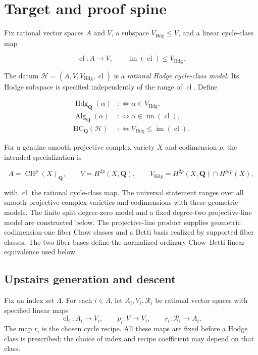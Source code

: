 \documentclass[11pt]{article}
\theoremstyle{definition}
\theoremstyle{remark}
\DeclareMathOperator{\CH}{CH}
\newcommand{\Q}{\mathbf Q}
\begin{document}
\begingroup
\small
\tableofcontents
\endgroup

\section{Target and proof spine}
\label{sec:target}

Fix rational vector spaces \(A\) and \(V\), a subspace
\(V_{\mathrm{Hdg}}\leq V\), and a linear cycle-class map

\[
  \operatorname{cl}:A\longrightarrow V,
  \qquad
  \operatorname{im}(\operatorname{cl})\leq V_{\mathrm{Hdg}}.
\]

The datum
\(\mathscr H=(A,V,V_{\mathrm{Hdg}},\operatorname{cl})\) is a
\emph{rational Hodge cycle-class model}.  Its Hodge subspace is specified independently
of the range of \(\operatorname{cl}\).  Define

\begin{align*}
  \operatorname{Hdg}_{\Q}(\alpha)&:\Longleftrightarrow
    \alpha\in V_{\mathrm{Hdg}},\\
  \operatorname{Alg}_{\Q}(\alpha)&:\Longleftrightarrow
    \alpha\in\operatorname{im}(\operatorname{cl}),\\
  \mathrm{HC}_{\Q}(\mathscr H)&:\Longleftrightarrow
    V_{\mathrm{Hdg}}\leq\operatorname{im}(\operatorname{cl}).
\end{align*}

For a genuine smooth projective complex variety \(X\) and codimension \(p\),
the intended specialization is

\[
  A=\CH^p(X)_{\Q},\qquad
  V=H^{2p}(X,\Q),\qquad
  V_{\mathrm{Hdg}}=H^{2p}(X,\Q)\cap H^{p,p}(X),
\]

with \(\operatorname{cl}\) the rational cycle-class map. The universal
statement ranges over all smooth projective complex varieties and
codimensions with these geometric models. The finite split degree-zero
model and a fixed degree-two projective-line model are constructed below.
The projective-line product supplies geometric codimension-one fiber Chow
classes and a Betti basis realized by supported fiber classes. The two fiber
bases define the normalized ordinary Chow--Betti linear equivalence used
below.

\subsection{Upstairs generation and descent}
\label{subsec:upstairs-generation}

Fix an index set \(\Lambda\). For each \(i\in\Lambda\), let
\(A_i,V_i,\mathcal R_i\) be rational vector spaces with specified linear maps
\[
 \operatorname{cl}_i:A_i\to V_i,\qquad
 p_i:V\to V_i,\qquad r_i:\mathcal R_i\to A_i.
\]
The map \(r_i\) is the chosen cycle recipe. All these maps are fixed before
a Hodge class is prescribed; the choice of index and recipe coefficient
may depend on that class.
\end{document}
